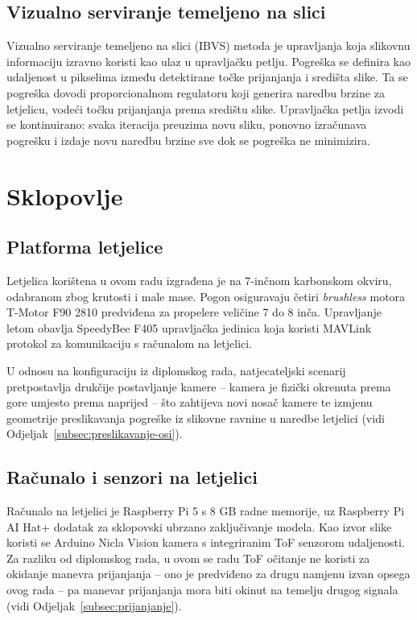 \subsection{Vizualno serviranje temeljeno na slici}
Vizualno serviranje temeljeno na slici (IBVS) metoda je upravljanja koja slikovnu informaciju izravno koristi kao ulaz u upravljačku petlju. Pogreška se definira kao udaljenost u pikselima između detektirane točke prijanjanja i središta slike. Ta se pogreška dovodi proporcionalnom regulatoru koji generira naredbu brzine za letjelicu, vodeći točku prijanjanja prema središtu slike. Upravljačka petlja izvodi se kontinuirano: svaka iteracija preuzima novu sliku, ponovno izračunava pogrešku i izdaje novu naredbu brzine sve dok se pogreška ne minimizira.

\section{Sklopovlje}
\label{sec:sklopovlje}

\subsection{Platforma letjelice}
Letjelica korištena u ovom radu izgrađena je na 7-inčnom karbonskom okviru, odabranom zbog krutosti i male mase. Pogon osiguravaju četiri \emph{brushless} motora T-Motor F90 2810 predviđena za propelere veličine 7 do 8 inča. Upravljanje letom obavlja SpeedyBee F405 upravljačka jedinica koja koristi MAVLink protokol za komunikaciju s računalom na letjelici.

U odnosu na konfiguraciju iz diplomskog rada, natjecateljski scenarij pretpostavlja drukčije postavljanje kamere -- kamera je fizički okrenuta prema gore umjesto prema naprijed -- što zahtijeva novi nosač kamere te izmjenu geometrije preslikavanja pogreške iz slikovne ravnine u naredbe letjelici (vidi Odjeljak~\ref{subsec:preslikavanje-osi}).

\subsection{Računalo i senzori na letjelici}
Računalo na letjelici je Raspberry Pi 5 s 8 GB radne memorije, uz Raspberry Pi AI Hat+ dodatak za sklopovski ubrzano zaključivanje modela. Kao izvor slike koristi se Arduino Nicla Vision kamera s integriranim ToF senzorom udaljenosti. Za razliku od diplomskog rada, u ovom se radu ToF očitanje ne koristi za okidanje manevra prijanjanja -- ono je predviđeno za drugu namjenu izvan opsega ovog rada -- pa manevar prijanjanja mora biti okinut na temelju drugog signala (vidi Odjeljak~\ref{subsec:prijanjanje}).

